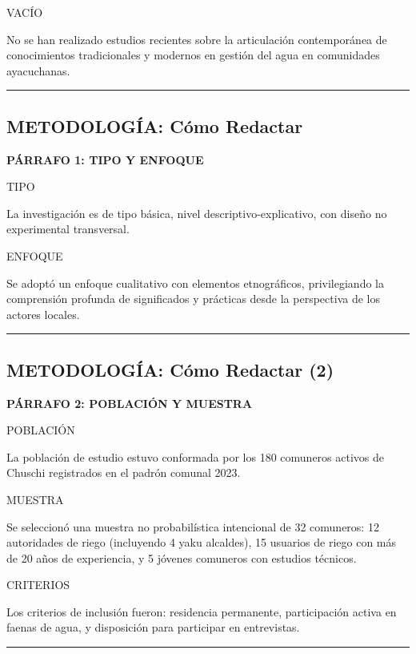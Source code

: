 \documentclass[
  11pt,
]{beaner}
\begin{document}
{VACÍO}

No se han realizado estudios recientes sobre la articulación
contemporánea de conocimientos tradicionales y modernos en gestión del
agua en comunidades ayacuchanas.

\begin{center}\rule{0.5\linewidth}{0.5pt}\end{center}

\subsection{METODOLOGÍA: Cómo
Redactar}\label{metodologuxeda-cuxf3mo-redactar}

\textbf{PÁRRAFO 1: TIPO Y ENFOQUE}

{TIPO}

La investigación es de tipo básica, nivel descriptivo-explicativo, con
diseño no experimental transversal.

{ENFOQUE}

Se adoptó un enfoque cualitativo con elementos etnográficos,
privilegiando la comprensión profunda de significados y prácticas desde
la perspectiva de los actores locales.

\begin{center}\rule{0.5\linewidth}{0.5pt}\end{center}

\subsection{METODOLOGÍA: Cómo Redactar
(2)}\label{metodologuxeda-cuxf3mo-redactar-2}

\textbf{PÁRRAFO 2: POBLACIÓN Y MUESTRA}

{POBLACIÓN}

La población de estudio estuvo conformada por los 180 comuneros activos
de Chuschi registrados en el padrón comunal 2023.

{MUESTRA}

Se seleccionó una muestra no probabilística intencional de 32 comuneros:
12 autoridades de riego (incluyendo 4 yaku alcaldes), 15 usuarios de
riego con más de 20 años de experiencia, y 5 jóvenes comuneros con
estudios técnicos.

{CRITERIOS}

Los criterios de inclusión fueron: residencia permanente, participación
activa en faenas de agua, y disposición para participar en entrevistas.

\begin{center}\rule{0.5\linewidth}{0.5pt}\end{center}
\end{document}
